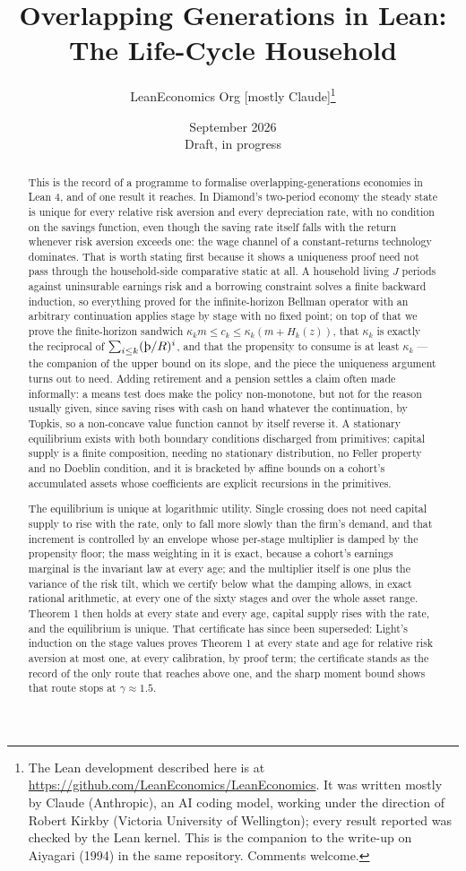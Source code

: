 \documentclass[11pt]{article}
\title{Overlapping Generations in Lean:\\ The Life-Cycle Household}
\author{LeanEconomics Org [mostly Claude]\thanks{The Lean development described here is at
\url{https://github.com/LeanEconomics/LeanEconomics}. It was written mostly by Claude (Anthropic),
an AI coding model, working under the direction of Robert Kirkby (Victoria University of
Wellington); every result reported was checked by the Lean kernel. This is the companion to the
write-up on Aiyagari (1994) in the same repository. Comments welcome.}}
\date{September 2026\\[0.5em]\small Draft, in progress}
\theoremstyle{definition}
\theoremstyle{remark}
\newcommand{\Thorn}{\text{\th}}
\begin{document}
\maketitle

\begin{abstract}
\noindent
This is the record of a programme to formalise overlapping-generations economies in Lean 4, and of
one result it reaches. In Diamond's two-period economy the steady state is unique for every relative
risk aversion and every depreciation rate, with no condition on the savings function, even though the
saving rate itself falls with the return whenever risk aversion exceeds one: the wage channel of a
constant-returns technology dominates. That is worth stating first because it shows a uniqueness proof
need not pass through the household-side comparative static at all. A household living $J$ periods
against uninsurable earnings risk and a borrowing constraint solves a finite backward induction, so
everything proved for the infinite-horizon Bellman operator with an arbitrary continuation applies
stage by stage with no fixed point; on top of that we prove the finite-horizon sandwich
$\kappa_km\le c_k\le\kappa_k(m+H_k(z))$, that $\kappa_k$ is exactly the reciprocal of
$\sum_{i\le k}(\Thorn/R)^i$, and that the propensity to consume is at least $\kappa_k$ --- the
companion of the upper bound on its slope, and the piece the uniqueness argument turns out to need.
Adding retirement and a pension settles a claim often made informally: a means test does make the
policy non-monotone, but not for the reason usually given, since saving rises with cash on hand
whatever the continuation, by Topkis, so a non-concave value function cannot by itself reverse it.
A stationary equilibrium exists with both boundary conditions discharged from primitives: capital
supply is a finite composition, needing no stationary distribution, no Feller property and no Doeblin
condition, and it is bracketed by affine bounds on a cohort's accumulated assets whose coefficients
are explicit recursions in the primitives.

The equilibrium is unique at logarithmic utility. Single crossing does not need capital supply to rise
with the rate, only to fall more slowly than the firm's demand, and that increment is controlled by an
envelope whose per-stage multiplier is damped by the propensity floor; the mass weighting in it is
exact, because a cohort's earnings marginal is the invariant law at every age; and the multiplier
itself is one plus the variance of the risk tilt, which we certify below what the damping allows, in
exact rational arithmetic, at every one of the sixty stages and over the whole asset range. Theorem 1
then holds at every state and every age, capital supply rises with the rate, and the equilibrium is
unique. That certificate has since been superseded: Light's induction on the stage values proves
Theorem 1 at every state and age for relative risk aversion at most one, at every calibration, by
proof term; the certificate stands as the record of the only route that reaches above one, and the
sharp moment bound shows that route stops at $\gamma\approx1.5$.


\end{abstract}
\end{document}
